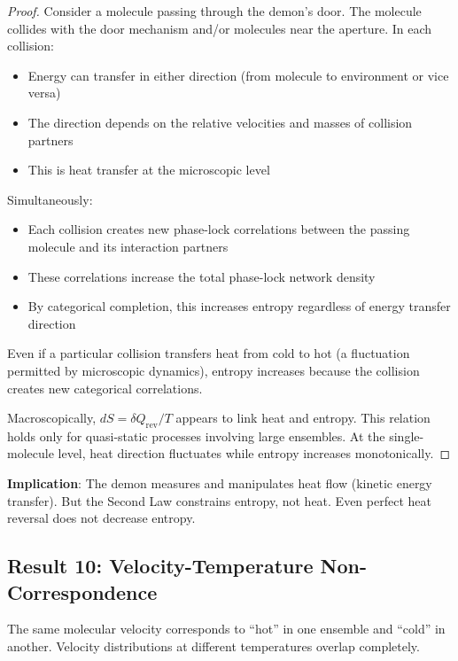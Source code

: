 \begin{proof}
Consider a molecule passing through the demon's door. The molecule collides with the door mechanism and/or molecules near the aperture. In each collision:
\begin{itemize}
\item Energy can transfer in either direction (from molecule to environment or vice versa)
\item The direction depends on the relative velocities and masses of collision partners
\item This is heat transfer at the microscopic level
\end{itemize}

Simultaneously:
\begin{itemize}
\item Each collision creates new phase-lock correlations between the passing molecule and its interaction partners
\item These correlations increase the total phase-lock network density
\item By categorical completion, this increases entropy regardless of energy transfer direction
\end{itemize}

Even if a particular collision transfers heat from cold to hot (a fluctuation permitted by microscopic dynamics), entropy increases because the collision creates new categorical correlations.

Macroscopically, $dS = \delta Q_{\text{rev}}/T$ appears to link heat and entropy. This relation holds only for quasi-static processes involving large ensembles. At the single-molecule level, heat direction fluctuates while entropy increases monotonically.
\end{proof}

\textbf{Implication}: The demon measures and manipulates heat flow (kinetic energy transfer). But the Second Law constrains entropy, not heat. Even perfect heat reversal does not decrease entropy.

\subsection{Result 10: Velocity-Temperature Non-Correspondence}

\begin{theorem}
\label{thm:velocity_temperature}
The same molecular velocity corresponds to ``hot'' in one ensemble and ``cold'' in another. Velocity distributions at different temperatures overlap completely.
\end{theorem}

